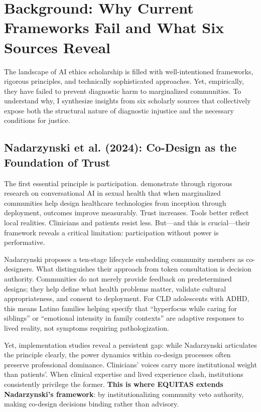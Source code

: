 \documentclass[12pt,a4paper]{article}
\begin{document}
\section{Background: Why Current Frameworks Fail and What Six Sources Reveal}

The landscape of AI ethics scholarship is filled with well-intentioned frameworks, rigorous principles, and technically sophisticated approaches. Yet, empirically, they have failed to prevent diagnostic harm to marginalized communities. To understand why, I synthesize insights from six scholarly sources that collectively expose both the structural nature of diagnostic injustice and the necessary conditions for justice.

\subsection{Nadarzynski et al. (2024): Co-Design as the Foundation of Trust}

The first essential principle is participation. \citet{Nadarzynski2024} demonstrate through rigorous research on conversational AI in sexual health that when marginalized communities help design healthcare technologies from inception through deployment, outcomes improve measurably. Trust increases. Tools better reflect local realities. Clinicians and patients resist less. But---and this is crucial---their framework reveals a critical limitation: participation without power is performative.

Nadarzynski proposes a ten-stage lifecycle embedding community members as co-designers. What distinguishes their approach from token consultation is decision authority. Communities do not merely provide feedback on predetermined designs; they help define what health problems matter, validate cultural appropriateness, and consent to deployment. For CLD adolescents with ADHD, this means Latino families helping specify that ``hyperfocus while caring for siblings'' or ``emotional intensity in family contexts'' are adaptive responses to lived reality, not symptoms requiring pathologization.

Yet, implementation studies reveal a persistent gap: while Nadarzynski articulates the principle clearly, the power dynamics within co-design processes often preserve professional dominance. Clinicians' voices carry more institutional weight than patients'. When clinical expertise and lived experience clash, institutions consistently privilege the former. \textbf{This is where EQUITAS extends Nadarzynski's framework}: by institutionalizing community veto authority, making co-design decisions binding rather than advisory.
\end{document}
